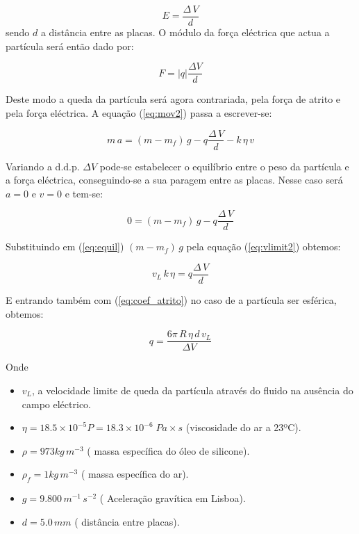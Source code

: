 \documentclass[a4paper,twoside,12pt]{article}      %
\begin{document}
\begin{equation*}
	E = \frac{\Delta\, V}{d}
\end{equation*}
sendo $d$ a distância entre as placas. O módulo da força eléctrica que actua a partícula será então  dado por: 

\begin{equation*}
	F = |q| \frac{\Delta V}{d}
\end{equation*}

Deste modo a queda da partícula será agora contrariada, pela força de atrito e pela força eléctrica. A equação (\ref{eq:mov2}) passa a escrever-se:

\begin{equation}
	\label{eq:mov3}
	m\,a = (m - m_f)\,g  - q \frac{\Delta\, V}{d} - k  \, \eta \, v
\end{equation}

Variando a d.d.p. $\Delta V$ pode-se estabelecer o equilíbrio entre o peso da partícula e a força eléctrica, conseguindo-se a sua paragem entre as placas. Nesse caso será $a=0$ e $v=0$ e tem-se:

\begin{equation}
	\label{eq:equil}
	0 = (m - m_f)\,g  - q \frac{\Delta\, V}{d} 
\end{equation}

Substituindo em (\ref{eq:equil}) $(m - m_f)\,g$   pela equação (\ref{eq:vlimit2}) obtemos:

\begin{equation*}
	v_L\, k\, \eta = q \frac{\Delta\, V}{d}
\end{equation*}

E entrando também com (\ref{eq:coef_atrito}) no caso de a partícula ser esférica, obtemos:

\begin{equation}
	\label{eq:carga}
	q = \frac{6 \pi \, R \, \eta \, d\, v_L}{\Delta V}  
\end{equation}

Onde

\begin{itemize}
\item $v_L$, a velocidade limite de queda da partícula através do fluido na ausência do campo eléctrico. 
\item $\eta = 18.5 \times 10^{-5} P =  18.3 \times 10^{-6} \; Pa\times s $ (viscosidade do ar a 23ºC).
\item $\rho = 973 kg\,m^{-3}$ ( massa específica do óleo de silicone).
\item $\rho_f = 1 kg\,m^{-3}$ ( massa específica do ar).
\item $g=9.800\, m^{-1}\,s^{-2}$ ( Aceleração gravítica em Lisboa).
\item $d=5.0\, mm$ ( distância entre placas).
\end{itemize}
\end{document}
